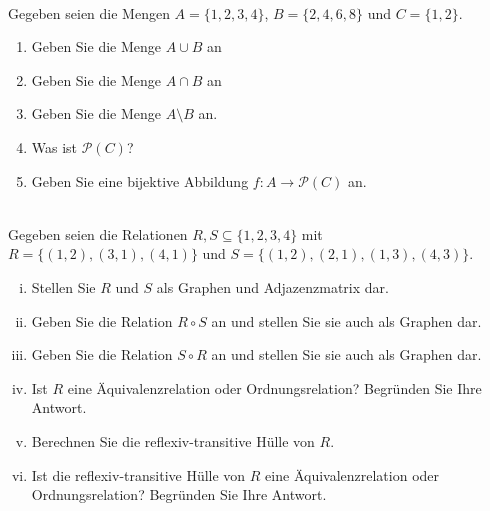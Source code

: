 \newcommand{\printpraesenzlsg}{false}
\newcommand{\printloesungen}{false}
\newcommand{\printbewertungen}{false}
\newcommand{\blattnummer}{1}




\iforiginal{}
\\
Gegeben seien die Mengen $A=\{1,2,3,4\}$, $B=\{2,4,6,8\}$ und $C=\{1,2\}$.
\begin{enumerate}
\item Geben Sie die Menge $A\cup B$ an
\item Geben Sie die Menge $A\cap B$ an
\item Geben Sie die Menge $A\setminus B$ an.
\item Was ist $\mathscr{P}(C)$?
\item Geben Sie eine bijektive Abbildung $f:A\to\mathscr{P}(C)$ an.

\end{enumerate}

\\
Gegeben seien die Relationen $R,S\subseteq\{1,2,3,4\}$ mit $R=\{(1,2),(3,1),(4,1)\}$ und $S=\{(1,2),(2,1),(1,3),(4,3)\}$.
\begin{enumerate}[(i)]
    \item Stellen Sie $R$ und $S$ als Graphen und Adjazenzmatrix dar.
    \item Geben Sie die Relation $R\circ S$ an und stellen Sie sie auch als Graphen dar.
    \item Geben Sie die Relation $S\circ R$ an und stellen Sie sie auch als Graphen dar.
    \item Ist $R$ eine Äquivalenzrelation oder Ordnungsrelation? Begründen Sie Ihre Antwort.
    \item Berechnen Sie die reflexiv-transitive Hülle von $R$.
    \item Ist die reflexiv-transitive Hülle von $R$ eine Äquivalenzrelation oder Ordnungsrelation? Begründen Sie Ihre Antwort.

\end{enumerate}


